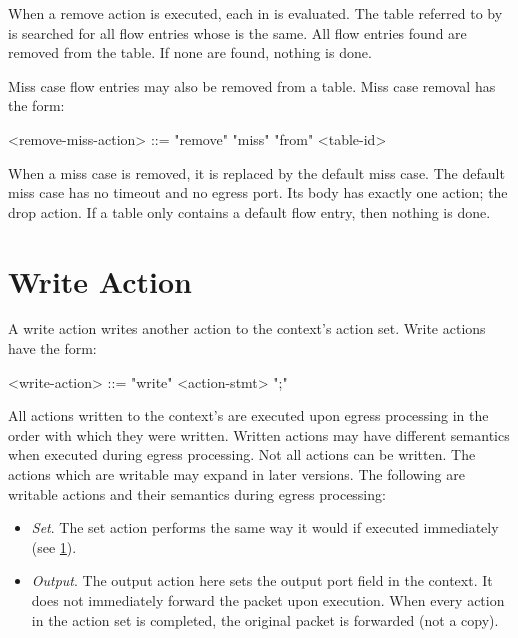 When a remove action is executed, each  in  is evaluated. The table referred to by  is searched for all flow entries whose  is the same. All flow entries found are removed from the table. If none are found, nothing is done.

Miss case flow entries may also be removed from a table. Miss case removal has the form: 

\begin{minip}
\begin{grammar}
<remove-miss-action> ::= "remove" "miss" "from" <table-id>
\end{grammar}
\end{minip}

When a miss case is removed, it is replaced by the default miss case. The default miss case has no timeout and no egress port. Its body has exactly one action; the drop action. If a table only contains a default flow entry, then nothing is done.

\section{Write Action} \label{guide:write}

A write action writes another action to the context's action set. Write actions have the form:

\begin{minip}
\begin{grammar}
<write-action> ::= "write" <action-stmt> ";"
\end{grammar}
\end{minip}

All actions written to the context's are executed upon egress processing in the order with which they were written. Written actions may have different semantics when executed during egress processing. Not all actions can be written. The actions which are writable may expand in later versions. The following are writable actions and their semantics during egress processing:

\begin{itemize}
\item \textit{Set}. The set action performs the same way it would if executed immediately (see \ref{guide:write}). 

\item \textit{Output}. The output action here sets the output port field in the context. It does not immediately forward the packet upon execution. When every action in the action set is completed, the original packet is forwarded (not a copy).
\end{itemize}

